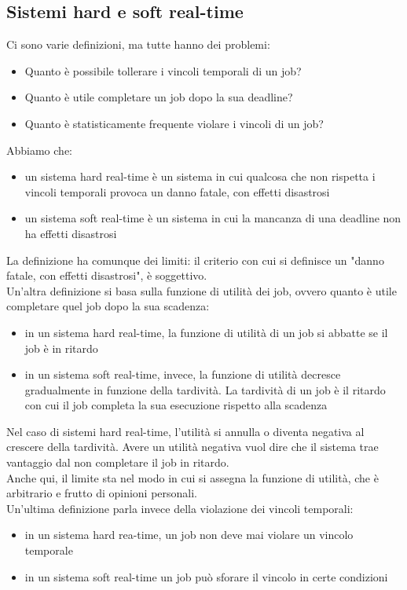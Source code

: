 \documentclass{article}
\begin{document}
\subsection{Sistemi hard e soft real-time}
Ci sono varie definizioni, ma tutte hanno dei problemi:
\begin{itemize}
\item Quanto è possibile tollerare i vincoli temporali di un job?
\item Quanto è utile completare un job dopo la sua deadline?
\item Quanto è statisticamente frequente violare i vincoli di un job?
\end{itemize}
Abbiamo che:
\begin{itemize}
\item un sistema hard real-time è un sistema in cui qualcosa che non rispetta i vincoli temporali provoca un danno fatale, con effetti disastrosi
\item un sistema soft real-time è un sistema in cui la mancanza di una deadline non ha effetti disastrosi
\end{itemize}
La definizione ha comunque dei limiti: il criterio con cui si definisce un "danno fatale, con effetti disastrosi", è soggettivo.\\ Un'altra definizione si basa sulla funzione di utilità dei job, ovvero quanto è utile completare quel job dopo la sua scadenza:
\begin{itemize}
\item in un sistema hard real-time, la funzione di utilità di un job si abbatte se il job è in ritardo
\item in un sistema soft real-time, invece, la funzione di utilità decresce gradualmente in funzione della tardività. La tardività di un job è il ritardo con cui il job completa la sua esecuzione rispetto alla scadenza
\end{itemize}
Nel caso di sistemi hard real-time, l'utilità si annulla o diventa negativa al crescere della tardività. Avere un utilità negativa vuol dire che il sistema trae vantaggio dal non completare il job in ritardo.\\ Anche qui, il limite sta nel modo in cui si assegna la funzione di utilità, che è arbitrario e frutto di opinioni personali.\\ Un'ultima definizione parla invece della violazione dei vincoli temporali:
\begin{itemize}
\item in un sistema hard rea-time, un job non deve mai violare un vincolo temporale
\item in un sistema soft real-time un job può sforare il vincolo in certe condizioni
\end{itemize}
\end{document}
